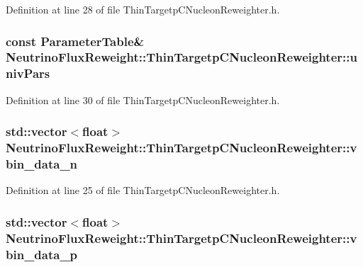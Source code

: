 Definition at line 28 of file Thin\-Targetp\-C\-Nucleon\-Reweighter.\-h.

\hypertarget{class_neutrino_flux_reweight_1_1_thin_targetp_c_nucleon_reweighter_a46e36f7b2a8a95bd45bb748408e3bace}{
\subsubsection[{univ\-Pars}]{\setlength{\rightskip}{0pt plus 5cm}const {\bf Parameter\-Table}\& Neutrino\-Flux\-Reweight\-::\-Thin\-Targetp\-C\-Nucleon\-Reweighter\-::univ\-Pars\hspace{0.3cm}{\ttfamily [private]}}}\label{class_neutrino_flux_reweight_1_1_thin_targetp_c_nucleon_reweighter_a46e36f7b2a8a95bd45bb748408e3bace}


Definition at line 30 of file Thin\-Targetp\-C\-Nucleon\-Reweighter.\-h.

\hypertarget{class_neutrino_flux_reweight_1_1_thin_targetp_c_nucleon_reweighter_a3ad5552b4cf05ff2f81a93f3d13432ad}{
\subsubsection[{vbin\-\_\-data\-\_\-n}]{\setlength{\rightskip}{0pt plus 5cm}std\-::vector$<$float$>$ Neutrino\-Flux\-Reweight\-::\-Thin\-Targetp\-C\-Nucleon\-Reweighter\-::vbin\-\_\-data\-\_\-n}}\label{class_neutrino_flux_reweight_1_1_thin_targetp_c_nucleon_reweighter_a3ad5552b4cf05ff2f81a93f3d13432ad}


Definition at line 25 of file Thin\-Targetp\-C\-Nucleon\-Reweighter.\-h.

\hypertarget{class_neutrino_flux_reweight_1_1_thin_targetp_c_nucleon_reweighter_affc490a2bc6f148c1eab12f3cba2457d}{
\subsubsection[{vbin\-\_\-data\-\_\-p}]{\setlength{\rightskip}{0pt plus 5cm}std\-::vector$<$float$>$ Neutrino\-Flux\-Reweight\-::\-Thin\-Targetp\-C\-Nucleon\-Reweighter\-::vbin\-\_\-data\-\_\-p}}\label{class_neutrino_flux_reweight_1_1_thin_targetp_c_nucleon_reweighter_affc490a2bc6f148c1eab12f3cba2457d}


